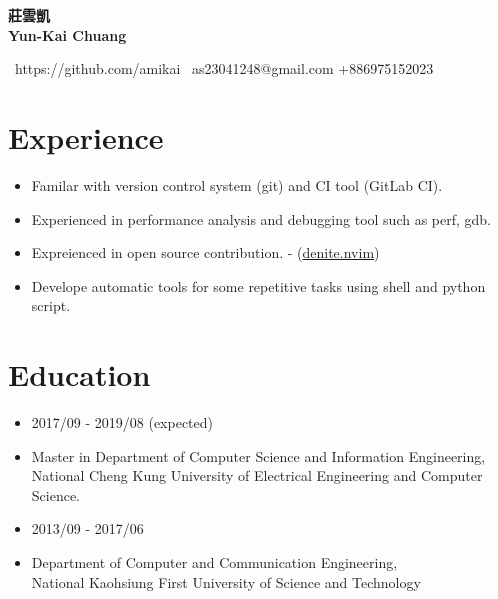 \documentclass[12pt]{article}
\begin{document}
\begin{CJK*}{UTF8}{bsmi}

\begin{center}

\noindent  \LARGE{\textbf{莊雲凱}}
\\ \vspace{0.2cm}
\noindent  \LARGE{\textbf{Yun-Kai Chuang}}
\normalsize
\end{center}

\href{https://github.com/amikai}{\faGithub}\ https://github.com/amikai \hspace*{1cm}
\href{mailto://as23041248@gmail.com}{\faEnvelope}\ as23041248@gmail.com \hspace*{1cm}
\href{tel:886975152023}{\faPhone} +886975152023

	\section*{Experience}
	\nointerlineskip
		\begin{itemize}
		\item Familar with version control system (git) and CI tool (GitLab CI).
		\item Experienced in performance analysis and debugging tool such as perf, gdb.
		\item Expreienced in open source contribution. - (\href{https://github.com/Shougo/denite.nvim}{denite.nvim})
		\item Develope automatic tools for some repetitive tasks using shell and python script.
		\end{itemize}


	
	\section*{Education}
	\nointerlineskip
		\begin{itemize}
			\item 2017/09 - 2019/08 (expected)
			\vspace{-6pt}
			\item[] Master in Department of Computer Science and Information Engineering,
			\\ National Cheng Kung University of Electrical Engineering and Computer Science.
		\end{itemize}
	  
	  
	  \begin{itemize}
	  	\item 2013/09 - 2017/06
	  	\vspace{-6pt}
	  	\item[]       Department of Computer and Communication Engineering, 
      	\\National Kaohsiung First University of Science and Technology
	  \end{itemize}


\end{CJK*}
\end{document}
